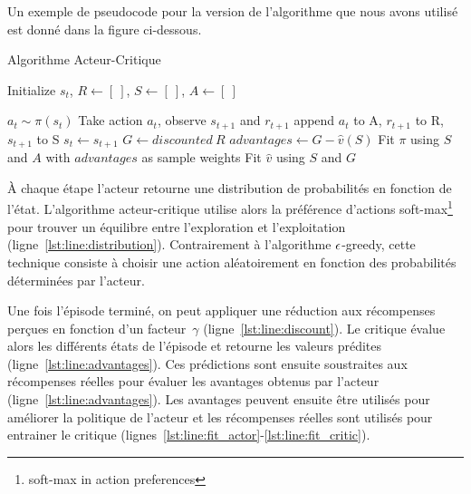 Un exemple de pseudocode pour la version de l'algorithme que nous avons utilisé est donné dans la figure ci-dessous.
\begin{algorithm}
\caption{Algorithme Acteur-Critique}\label{alg:a2c}
\begin{algorithmic}[1]

\State Initialize $s_t$, $R \gets [~]$, $S \gets [~]$, $A \gets [~]$

\State $a_t \sim \pi(s_t)$  \label{lst:line:distribution}
  \State Take action $a_t$, observe $s_{t+1}$ and $r_{t+1}$
\State append $a_t$ to A, $r_{t+1}$ to R, $s_{t+1}$ to S
  \State $s_t \gets s_{t+1}$
\EndFor
\State $G \gets discounted~R$ \label{lst:line:discount}
\State $advantages \gets G - \hat{v}(S)$  \label{lst:line:advantages}
\State Fit $\pi$ using \(S\) and \(A\) with $advantages$ as sample weights \label{lst:line:fit_actor}
\State Fit $\hat{v}$ using \(S\) and \(G\) \label{lst:line:fit_critic}
\EndFor
\end{algorithmic}
\end{algorithm}

À chaque étape l'acteur retourne une distribution de probabilités en fonction de l'état.
L'algorithme acteur-critique utilise alors la préférence d'actions soft-max\footnote{soft-max in action preferences} pour trouver un équilibre entre l'exploration et l'exploitation (ligne~\ref{lst:line:distribution}). 
Contrairement à l'algorithme $\large\epsilon$-greedy, cette technique consiste à choisir une action aléatoirement en fonction des probabilités déterminées par l'acteur. \cite{BartoSutton}

Une fois l'épisode terminé, on peut appliquer une réduction aux récompenses perçues en fonction d'un facteur~$\gamma$ (ligne~\ref{lst:line:discount}).
Le critique évalue alors les différents états de l'épisode et retourne les valeurs prédites (ligne~\ref{lst:line:advantages}).
Ces prédictions sont ensuite soustraites aux récompenses réelles pour évaluer les avantages obtenus par l'acteur (ligne~\ref{lst:line:advantages}).
Les avantages peuvent ensuite être utilisés pour améliorer la politique de l'acteur et les récompenses réelles sont utilisés pour 
entrainer le critique (lignes~\ref{lst:line:fit_actor}-\ref{lst:line:fit_critic}).
